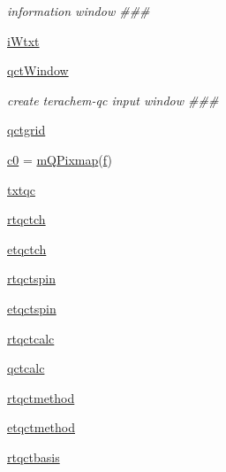 \begin{DoxyCompactItemize}
\begin{DoxyCompactList}\small\item\em information window \#\#\# \end{DoxyCompactList}\item 
\hyperlink{classmolSimplify_1_1Classes_1_1mGUI_1_1mGUI_a9f0f8231268db220e5fc21170d7732fe}{i\+Wtxt}
\item 
\hyperlink{classmolSimplify_1_1Classes_1_1mGUI_1_1mGUI_a1b3fb4dad6eb7a879f18863a15d7b3e5}{qct\+Window}
\begin{DoxyCompactList}\small\item\em create terachem-\/qc input window \#\#\# \end{DoxyCompactList}\item 
\hyperlink{classmolSimplify_1_1Classes_1_1mGUI_1_1mGUI_adf9e1003fed2d1b906bf18b5bdde2ebe}{qctgrid}
\item 
\hyperlink{classmolSimplify_1_1Classes_1_1mGUI_1_1mGUI_a13781d65dc88747080bfcbe1e30a1eff}{c0} = \hyperlink{classmolSimplify_1_1Classes_1_1mWidgets_1_1mQPixmap}{m\+Q\+Pixmap}(\hyperlink{classmolSimplify_1_1Classes_1_1mGUI_1_1mGUI_a76137d1ef407b43266e051d20d866478}{f})
\item 
\hyperlink{classmolSimplify_1_1Classes_1_1mGUI_1_1mGUI_a615d31c0aea2778c5dbff36d38cc8ddc}{txtqc}
\item 
\hyperlink{classmolSimplify_1_1Classes_1_1mGUI_1_1mGUI_ae0996b585dbb817b5bd9764363db781c}{rtqctch}
\item 
\hyperlink{classmolSimplify_1_1Classes_1_1mGUI_1_1mGUI_a1461a9c9e92495c75b2340fecc03cbaa}{etqctch}
\item 
\hyperlink{classmolSimplify_1_1Classes_1_1mGUI_1_1mGUI_a8aa417e18b4e1390394c58a19ea7d2fe}{rtqctspin}
\item 
\hyperlink{classmolSimplify_1_1Classes_1_1mGUI_1_1mGUI_af21591c31636196d72c5c00480b1cf90}{etqctspin}
\item 
\hyperlink{classmolSimplify_1_1Classes_1_1mGUI_1_1mGUI_a3ff13d798686a398a623c2a4a863f319}{rtqctcalc}
\item 
\hyperlink{classmolSimplify_1_1Classes_1_1mGUI_1_1mGUI_aab02134218f1adea3958c2796fa5d12b}{qctcalc}
\item 
\hyperlink{classmolSimplify_1_1Classes_1_1mGUI_1_1mGUI_afed87539f520e9b086ff6eb3cfce1849}{rtqctmethod}
\item 
\hyperlink{classmolSimplify_1_1Classes_1_1mGUI_1_1mGUI_a04e729cb280d4bb2975ed1ba8ac10ee2}{etqctmethod}
\item 
\hyperlink{classmolSimplify_1_1Classes_1_1mGUI_1_1mGUI_a02ebd386cd7f77c76cd052869d26a90d}{rtqctbasis}

\end{DoxyCompactItemize}
